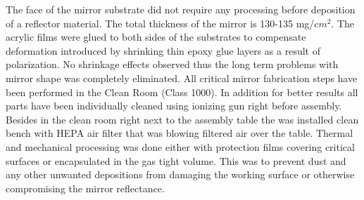\indent The face of the mirror substrate did not require any processing before deposition of a reflector material. The total thickness of the mirror is 130-135 mg/$cm^{2}$. The acrylic films were glued to both sides of the substrates to compensate deformation introduced by shrinking thin epoxy glue layers as a result of polarization. No shrinkage effects observed thus the long term problems with mirror shape was completely eliminated. All critical mirror fabrication steps have been performed in the Clean Room (Class 1000). In addition for better results all parts have been individually cleaned using ionizing gun right before assembly. Besides in the clean room right next to the assembly table the was installed clean bench with HEPA air filter that was blowing filtered air over the table. Thermal and mechanical processing was done either with protection films covering critical surfaces or encapsulated in the gas tight volume. This was to prevent dust and any other unwanted depositions from damaging the working surface or otherwise compromising the mirror reflectance.
